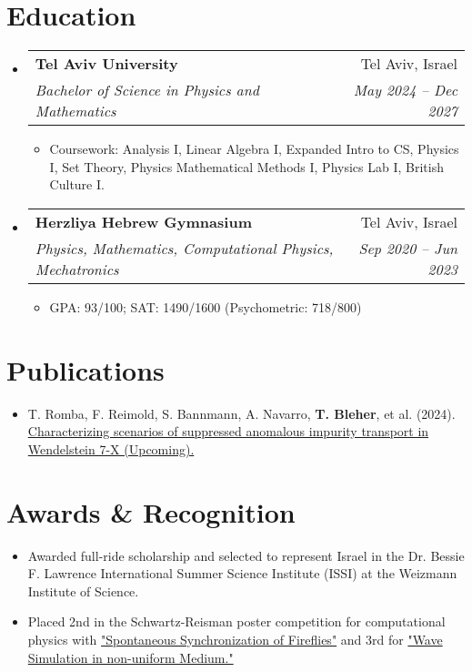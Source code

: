 \documentclass[letterpaper,11pt]{article}
\makeatletter
\newcommand{\resumeItem}[1]{
  \item\small{
    {#1 \vspace{-2pt}}
  }
}
\newcommand{\resumeSubheading}[4]{
  \vspace{-4pt}\item
    \begin{tabular*}{1\textwidth}[t]{l@{\extracolsep{\fill}}r}
      \textbf{#1} & #2 \\
      \textit{\small#3} & \textit{\small #4} \\
    \end{tabular*}\vspace{-7pt}
}
\newcommand{\resumeSubHeadingListStart}{\begin{itemize}[leftmargin=0.0in, label={}]}
\newcommand{\resumeSubHeadingListEnd}{\end{itemize}}
\newcommand{\resumeItemListStart}{\begin{itemize}}
\newcommand{\resumeItemListEnd}{\end{itemize}\vspace{-5pt}}
\makeatother
\begin{document}
\section{Education}
  \resumeSubHeadingListStart
    \resumeSubheading
      {Tel Aviv University}{Tel Aviv, Israel}
      {Bachelor of Science in Physics and Mathematics}{May 2024 -- Dec 2027}
      \resumeItemListStart
        \resumeItem{}
          {Coursework: Analysis I, Linear Algebra I, Expanded Intro to CS, Physics I, Set Theory, Physics Mathematical Methods I, Physics Lab I, British Culture I.}
      \resumeItemListEnd

    \resumeSubheading
      {Herzliya Hebrew Gymnasium}{Tel Aviv, Israel}
      {Physics, Mathematics, Computational Physics, Mechatronics}{Sep 2020 -- Jun 2023}
      \resumeItemListStart
        \resumeItem{}
          {GPA: 93/100; SAT: 1490/1600 (Psychometric: 718/800)}
      \resumeItemListEnd
  \resumeSubHeadingListEnd

\section{Publications}
  \resumeSubHeadingListStart
      \resumeItemListStart
        \resumeItem{}
          {T. Romba, F. Reimold, S. Bannmann, A. Navarro, \textbf{T. Bleher}, et al. (2024). \href{https://pure.mpg.de/pubman/faces/ViewItemOverviewPage.jsp?itemId=item_3610374_1}{Characterizing scenarios of suppressed anomalous impurity transport in Wendelstein 7-X (Upcoming).}}
      \resumeItemListEnd

  \resumeSubHeadingListEnd

\section{Awards \& Recognition}
  \resumeSubHeadingListStart
      \resumeItemListStart
        \resumeItem{}
          {Awarded full-ride scholarship and selected to represent Israel in the Dr. Bessie F. Lawrence International Summer Science Institute (ISSI) at the Weizmann Institute of Science.}
        \resumeItem{}
          {Placed 2nd in the Schwartz-Reisman poster competition for computational physics with \href{https://github.com/ilayws/SSoF}{"Spontaneous Synchronization of Fireflies"} and 3rd for \href{https://github.com/ilayws/NonuniformWaves}{"Wave Simulation in non-uniform Medium."}}          
          \resumeItemListEnd
  \resumeSubHeadingListEnd
  
\end{document}
